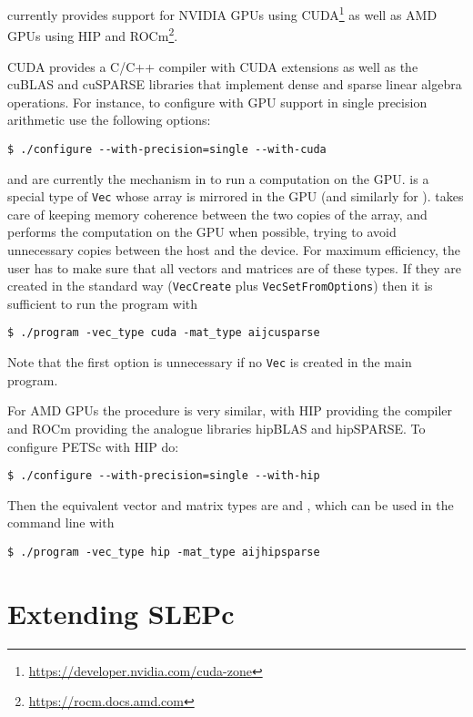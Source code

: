 \slepc currently provides support for NVIDIA GPUs using CUDA\footnote{\url{https://developer.nvidia.com/cuda-zone}} as well as AMD GPUs using HIP and ROCm\footnote{\url{https://rocm.docs.amd.com}}.

CUDA provides a C/C++ compiler with CUDA extensions as well as the cuBLAS and cuSPARSE libraries that implement dense and sparse linear algebra operations. For instance, to configure \petsc with GPU support in single precision arithmetic use the following options:
        \begin{Verbatim}[fontsize=\small]
        $ ./configure --with-precision=single --with-cuda
        \end{Verbatim}

 and  are currently the mechanism in \petsc to run a computation on the GPU.  is a special type of \texttt{Vec} whose array is mirrored in the GPU (and similarly for ). \petsc takes care of keeping memory coherence between the two copies of the array, and performs the computation on the GPU when possible, trying to avoid unnecessary copies between the host and the device. For maximum efficiency, the user has to make sure that all vectors and matrices are of these types. If they are created in the standard way (\texttt{VecCreate} plus \texttt{VecSetFromOptions}) then it is sufficient to run the \slepc program with
        \begin{Verbatim}[fontsize=\small]
        $ ./program -vec_type cuda -mat_type aijcusparse
        \end{Verbatim}
Note that the first option is unnecessary if no \texttt{Vec} is created in the main program.

For AMD GPUs the procedure is very similar, with HIP providing the compiler and ROCm providing the analogue libraries hipBLAS and hipSPARSE. To configure PETSc with HIP do:
        \begin{Verbatim}[fontsize=\small]
        $ ./configure --with-precision=single --with-hip
        \end{Verbatim}
Then the equivalent vector and matrix types are  and , which can be used in the command line with
        \begin{Verbatim}[fontsize=\small]
        $ ./program -vec_type hip -mat_type aijhipsparse
        \end{Verbatim}

\section{Extending SLEPc}
\label{sec:shell}

